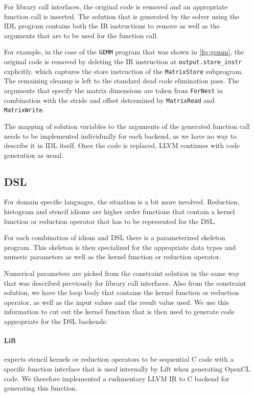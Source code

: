    For library call interfaces, the original code is removed and an appropriate
    function call is inserted.
    The solution that is generated by the solver using the IDL program contains
    both the IR instructions to remove as well as the arguments that are to be
    used for the function call.

    For example, in the case of the {\tt GEMM} program that was shown in
    \autoref{fig:gemm}, the original code is removed by deleting the IR
    instruction at {\tt output.store\_instr} explicitly, which captures the
    store instruction of the {\tt MatrixStore} subprogram.
    The remaining cleanup is left to the standard dead code elimination pass.
    The arguments that specify the matrix dimensions are taken from
    {\tt ForNest} in combination with the stride and offset determined by
    {\tt MatrixRead} and {\tt MatrixWrite}.

    The mapping of solution variables to the arguments of the generated function
    call needs to be implemented individually for each backend, as we have no
    way to describe it in IDL itself.
    Once the code is replaced, LLVM continues with code generation as usual.

\subsection{DSL}

    For domain specific languages, the situation is a bit more involved.
    Reduction, histogram and stencil idioms are higher order functions that
    contain a kernel function or reduction operator that has to be represented
    for the DSL.

    For each combination of idiom and DSL there is a parameterized
    skeleton program.
    This skeleton is then specialized for the appropriate data types and numeric
    parameters as well as the kernel function or reduction operator.

    Numerical parameters are picked from the constraint solution in the same way
    that was described previously for library call interfaces.
    Also from the constraint solution, we have the loop body that contains the
    kernel function or reduction operator, as well as the input values and the
    result value used.
    We use this information to cut out the kernel function that is then used to
    generate code appropriate for the DSL backends:

\paragraph{Lift}  expects stencil kernels or reduction operators to be sequential C code with a specific function interface that
is used internally by Lift when generating OpenCL code.
We therefore implemented a rudimentary LLVM IR to C backend for generating this function.

